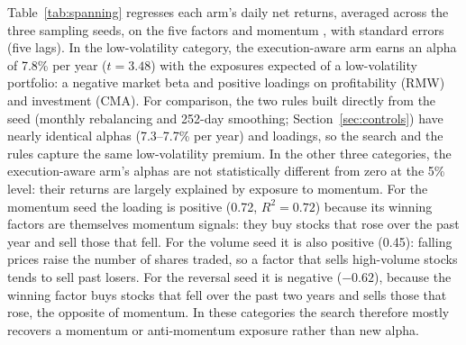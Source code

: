 \documentclass[preprint,12pt,authoryear]{elsarticle}
\begin{document}
Table~\ref{tab:spanning} regresses each arm's daily net returns, averaged across the three sampling seeds, on the \citet{fama2015} five factors and momentum \citep{carhart1997,french2026}, with \citet{newey1987} standard errors (five lags). In the low-volatility category, the execution-aware arm earns an alpha of 7.8\% per year ($t = 3.48$) with the exposures expected of a low-volatility portfolio: a negative market beta and positive loadings on profitability (RMW) and investment (CMA). For comparison, the two rules built directly from the seed (monthly rebalancing and 252-day smoothing; Section~\ref{sec:controls}) have nearly identical alphas (7.3--7.7\% per year) and loadings, so the search and the rules capture the same low-volatility premium. In the other three categories, the execution-aware arm's alphas are not statistically different from zero at the 5\% level: their returns are largely explained by exposure to momentum. For the momentum seed the loading is positive (0.72, $R^2 = 0.72$) because its winning factors are themselves momentum signals: they buy stocks that rose over the past year and sell those that fell. For the volume seed it is also positive (0.45): falling prices raise the number of shares traded, so a factor that sells high-volume stocks tends to sell past losers. For the reversal seed it is negative ($-0.62$), because the winning factor buys stocks that fell over the past two years and sells those that rose, the opposite of momentum. In these categories the search therefore mostly recovers a momentum or anti-momentum exposure rather than new alpha.
\end{document}
